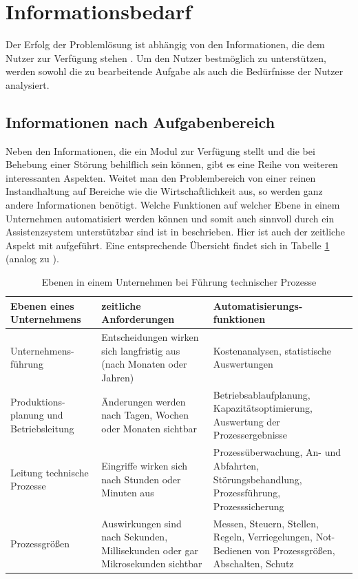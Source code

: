 \section{Informationsbedarf}
Der Erfolg der Problemlösung ist abhängig von den Informationen, die dem Nutzer zur Verfügung stehen \cite{Funke2015}. Um den Nutzer bestmöglich zu unterstützen, werden sowohl die zu bearbeitende Aufgabe als auch die Bedürfnisse der Nutzer analysiert.

\subsection{Informationen nach Aufgabenbereich}
Neben den Informationen, die ein Modul zur Verfügung stellt und die bei Behebung einer Störung behilflich sein können, gibt es eine Reihe von weiteren interessanten Aspekten. Weitet man den Problembereich von einer reinen Instandhaltung auf Bereiche wie die Wirtschaftlichkeit aus, so werden ganz andere Informationen benötigt. Welche Funktionen auf welcher Ebene in einem Unternehmen automatisiert werden können und somit auch sinnvoll durch ein Assistenzsystem unterstützbar sind ist in \cite{Lauber1999} beschrieben. Hier ist auch der zeitliche Aspekt mit aufgeführt. Eine entsprechende Übersicht findet sich in Tabelle \ref{tab:Ebenen-Unternehmen} (analog zu \cite{Lauber1999}).
\begin{table}[htb]
\centering
\caption{Ebenen in einem Unternehmen bei Führung technischer Prozesse}
\label{tab:Ebenen-Unternehmen}
\begin{tabular}{|p{}|p{}|p{}|}
\hline
\textbf{Ebenen eines Unternehmens} & \textbf{zeitliche Anforderungen} & \textbf{Automatisierungs-funktionen} \\
\hline
Unternehmens-führung & Entscheidungen wirken sich langfristig aus (nach Monaten oder Jahren) & Kostenanalysen, statistische Auswertungen \\
\hline
Produktions-planung und Betriebsleitung & Änderungen werden nach Tagen, Wochen oder Monaten sichtbar & Betriebsablaufplanung, Kapazitätsoptimierung, Auswertung der Prozessergebnisse \\
\hline
Leitung technische Prozesse & Eingriffe wirken sich nach Stunden oder Minuten aus & Prozessüberwachung, An- und Abfahrten, Störungsbehandlung, Prozessführung, Prozesssicherung \\
\hline
Prozessgrößen & Auswirkungen sind nach Sekunden, Millisekunden oder gar Mikrosekunden sichtbar & Messen, Steuern, Stellen, Regeln, Verriegelungen, Not-Bedienen von Prozessgrößen, Abschalten, Schutz \\
\hline
\end{tabular}
\end{table}

